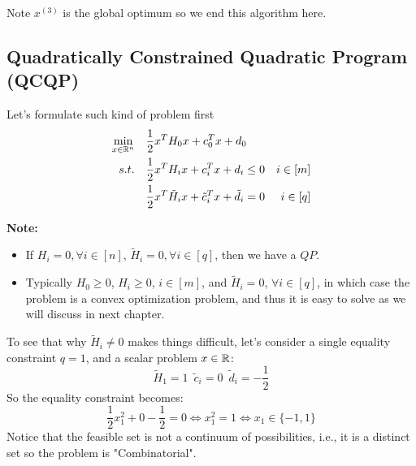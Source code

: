 Note $x^{(3)}$ is the global optimum so we end this algorithm here.



\vspace{0.5cm}
\subsection{Quadratically Constrained Quadratic Program (QCQP)}
Let's formulate such kind of problem first
\begin{align*}
\min_{x\in \mathbb{R}^n} \quad &\frac{1}{2}x^TH_0 x + c_0^T x + d_0\\
s.t.\quad &\frac{1}{2}x^TH_ix + c^T_i x + d_i \leq 0  & i\in [m]\\
&\frac{1}{2} x^T \tilde{H}_ix + \tilde{c}_i^Tx + \tilde{d}_i = 0 & i\in [q]
\end{align*}

\textbf{Note:}

\begin{itemize}
	\item If $H_i = 0, \forall i\in [n]$, $\tilde{H}_i = 0, \forall i\in [q]$, then we have a $QP$.
	
	\item Typically $H_0\geq 0$, $H_i\geq 0$, $i\in [m]$, and $\tilde{H}_i = 0$, $\forall i\in [q]$, in which case the problem is a convex optimization problem, and thus it is easy to solve as we will discuss in next chapter.
	
\end{itemize}

To see that why $\tilde{H}_i \neq 0$ makes things difficult, let's consider a single  equality constraint $q = 1$, and a scalar problem $x\in \mathbb{R}$:
$$\tilde{H}_1 = 1 \,\,\, \tilde{c}_i = 0 \,\,\, \tilde{d}_i = -\frac{1}{2}$$
So the equality constraint becomes:
$$\frac{1}{2}x_1^2 + 0 - \frac{1}{2} = 0 \Leftrightarrow x_1^2 = 1 \Leftrightarrow x_1\in\{-1, 1\} $$
Notice that the feasible set is not a continuum of possibilities, i.e., it is a distinct set so the problem is "Combinatorial".





